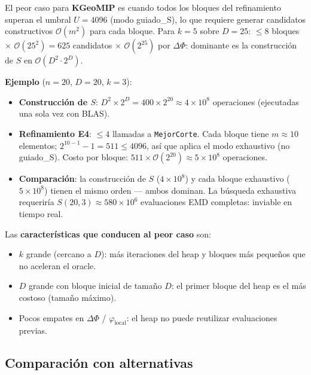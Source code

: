 \bigskip

El peor caso para \textbf{KGeoMIP} es cuando todos los bloques del refinamiento superan
el umbral $U = 4096$ (modo guiado\_S), lo que requiere generar candidatos constructivos
$\mathcal{O}(m^2)$ para cada bloque. Para $k=5$ sobre $D=25$: $\leq 8$ bloques $\times$
$\mathcal{O}(25^2) = 625$ candidatos $\times$ $\mathcal{O}(2^{25})$ por $\Delta\Phi$:
dominante es la construcción de $S$ en $\mathcal{O}(D^2 \cdot 2^D)$.

\smallskip
\noindent\textbf{Ejemplo} ($n = 20$, $D = 20$, $k = 3$):
\begin{itemize}
  \item \textbf{Construcción de $S$}: $D^2 \times 2^D = 400 \times 2^{20}
        \approx 4 \times 10^8$ operaciones (ejecutadas una sola vez con BLAS).
  \item \textbf{Refinamiento E4}: $\leq 4$ llamadas a \texttt{MejorCorte}.
        Cada bloque tiene $m \approx 10$ elementos; $2^{10-1}-1 = 511 \leq 4096$,
        así que aplica el modo exhaustivo (no guiado\_S). Costo por bloque:
        $511 \times \mathcal{O}(2^{20}) \approx 5 \times 10^8$ operaciones.
  \item \textbf{Comparación}: la construcción de $S$ ($4\times10^8$) y cada bloque
        exhaustivo ($5\times10^8$) tienen el mismo orden — ambos dominan. La
        búsqueda exhaustiva requeriría $S(20,3) \approx 580 \times 10^6$ evaluaciones
        EMD completas: inviable en tiempo real.
\end{itemize}

Las \textbf{características que conducen al peor caso} son:
\begin{itemize}
  \item $k$ grande (cercano a $D$): más iteraciones del heap y bloques más pequeños
        que no aceleran el oracle.
  \item $D$ grande con bloque inicial de tamaño $D$: el primer bloque del heap es el
        más costoso (tamaño máximo).
  \item Pocos empates en $\Delta\Phi$ / $\varphi_{\text{local}}$: el heap no puede
        reutilizar evaluaciones previas.
\end{itemize}

\subsection{Comparación con alternativas}

